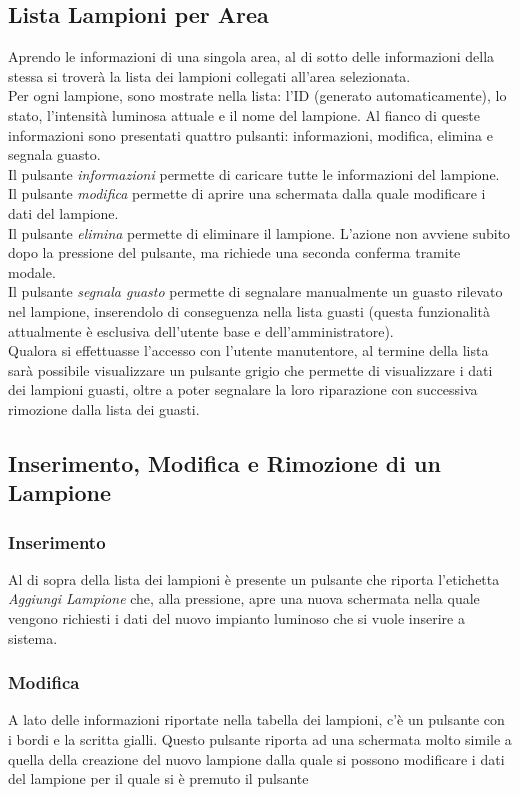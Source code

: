 \documentclass[a4paper, 12pt]{article}
\begin{document}
\subsection{Lista Lampioni per Area}
Aprendo le informazioni di una singola area, al di sotto delle informazioni della stessa si troverà la lista dei lampioni collegati all'area selezionata.\\
Per ogni lampione, sono mostrate nella lista: l'ID (generato automaticamente), lo stato, l'intensità luminosa attuale e il nome del lampione. Al fianco di queste informazioni sono presentati quattro pulsanti: informazioni, modifica, elimina e segnala guasto. \\
Il pulsante \textit{informazioni} permette di caricare tutte le informazioni del lampione.\\
Il pulsante \textit{modifica} permette di aprire una schermata dalla quale modificare i dati del lampione.\\
Il pulsante \textit{elimina} permette di eliminare il lampione. L'azione non avviene subito dopo la pressione del pulsante, ma richiede una seconda conferma tramite modale. \\
Il pulsante \textit{segnala guasto} permette di segnalare manualmente un guasto rilevato nel lampione, inserendolo di conseguenza nella lista guasti (questa funzionalità attualmente è esclusiva dell'utente base e dell'amministratore).\\
Qualora si effettuasse l'accesso con l'utente manutentore, al termine della lista sarà possibile visualizzare un pulsante grigio che permette di visualizzare i dati dei lampioni guasti, oltre a poter segnalare la loro riparazione con successiva rimozione dalla lista dei guasti.

\subsection{Inserimento, Modifica e Rimozione di un Lampione}
\subsubsection{Inserimento}
Al di sopra della lista dei lampioni è presente un pulsante che riporta l'etichetta \textit{Aggiungi Lampione} che, alla pressione, apre una nuova schermata nella quale vengono richiesti i dati del nuovo impianto luminoso che si vuole inserire a sistema.

\subsubsection{Modifica}
A lato delle informazioni riportate nella tabella dei lampioni, c'è un pulsante con i bordi e la scritta gialli. Questo pulsante riporta ad una schermata molto simile a quella della creazione del nuovo lampione dalla quale si possono modificare i dati del lampione per il quale si è premuto il pulsante
\end{document}
